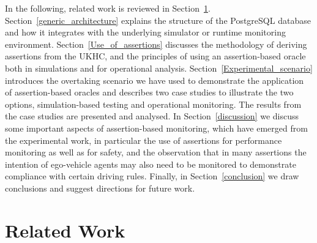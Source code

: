 In the following, related work is reviewed in Section~\ref{Related_work}. Section~\ref{generic_architecture} explains the structure of the PostgreSQL database and how it integrates with the underlying simulator or runtime monitoring environment. Section~\ref{Use_of_assertions} discusses the  methodology of deriving assertions from the UKHC, and the principles of using an assertion-based oracle both in simulations and for operational analysis. Section~\ref{Experimental_scenario} introduces the overtaking scenario we have used to demonstrate the application of assertion-based oracles and describes two case studies to illustrate the two options, simulation-based testing and operational monitoring. The results from the case studies are presented and analysed. In Section~\ref{discussion} we discuss some important aspects of assertion-based monitoring, which have emerged from the experimental work, in particular the use of assertions for performance monitoring as well as for safety, and the observation that in many assertions the intention of ego-vehicle agents may also need to be monitored to demonstrate compliance with certain driving rules. Finally, in Section~\ref{conclusion} we draw conclusions and suggest directions for future work.




\section{Related Work}
\label{Related_work}

